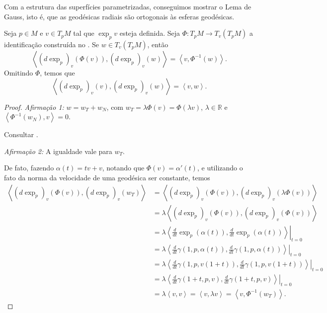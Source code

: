 Com a estrutura das superfícies parametrizadas, conseguimos mostrar o Lema de Gauss, isto é, que as geodésicas radiais são ortogonais às esferas geodésicas.
\begin{theorem}
    \label{teo:lema-de-gauss}
    Seja $p \in M$ e $v \in T_{p}M$ tal que $\exp_{p}v$ esteja definida. Seja $\Phi:T_{p}M\to T_{v}(T_{p}M)$ a identificação construída no .
    Se $w \in T_{v}(T_{p}M)$, então
    \begin{equation*}
        \left< (d\exp_{p})_{v}(\Phi(v)),(d\exp_{p})_{v}(w) \right> = \left< v,\Phi ^{-1}(w) \right> .
    \end{equation*}
    Omitindo $\Phi$, temos que
    \begin{equation*}
        \left< (d\exp_{p})_{v}(v),(d\exp_{p})_{v}(w) \right> = \left< v,w \right> .
    \end{equation*}
    \begin{proof}

        \emph{Afirmação 1:} $w=w_{T}+w_{N}$, com $w_{T}=\lambda \Phi(v)=\Phi(\lambda v)$, $\lambda \in \mathbb{R}$ e $\left< \Phi ^{-1}(w_{N}),v \right>=0$.

        Consultar \textcite{coelho2005algebra}.

        \emph{Afirmação 2:} A igualdade vale para $w_{T}$.

        De fato, fazendo $\alpha(t)=tv+v$, notando que $\Phi(v)=\alpha'(t)$, e utilizando o fato da norma da velocidade de uma geodésica ser constante, temos
        \begin{align*}
            \left< (d\exp_{p})_{v}(\Phi(v)),(d\exp_{p})_{v}(w_{T}) \right> & = \left< (d\exp_{p})_{v}(\Phi(v)),(d\exp_{p})_{v}(\lambda \Phi(v)) \right>                                        \\
                                                                           & = \lambda\left< (d\exp_{p})_{v}(\Phi(v)),(d\exp_{p})_{v}(\Phi(v)) \right>                                         \\
                                                                           & = \lambda \left< \left.\frac{d}{dt}\exp_{p}(\alpha(t)) , \frac{d}{dt}\exp_{p}(\alpha(t))\right>\right|_{t=0}      \\
                                                                           & = \lambda \left.\left< \frac{d}{dt}\gamma(1,p,\alpha(t)) ,\frac{d}{dt}\gamma(1,p,\alpha(t)) \right> \right|_{t=0} \\
                                                                           & = \lambda \left.\left< \frac{d}{dt}\gamma(1,p,v(1+t)) ,\frac{d}{dt}\gamma(1,p,v(1+t)) \right> \right|_{t=0}       \\
                                                                           & = \lambda \left.\left< \frac{d}{dt}\gamma(1+t,p,v) ,\frac{d}{dt}\gamma(1+t,p,v) \right> \right|_{t=0}             \\
                                                                           & = \lambda \left< v,v \right>   = \left< v,\lambda v \right> = \left< v,\Phi ^{-1}(w_{T}) \right>.
        \end{align*}


\end{proof}
\end{theorem}
